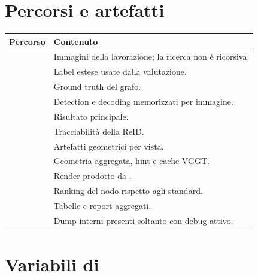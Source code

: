 \section{Percorsi e artefatti}

\begin{longtable}{P{0.43\textwidth}P{0.45\textwidth}}
\toprule
\textbf{Percorso} & \textbf{Contenuto}\\
\midrule\endhead
{} & Immagini della lavorazione; la ricerca non è ricorsiva.\\
 & Label estese usate dalla valutazione.\\
 & Ground truth del grafo.\\
 & Detection e decoding memorizzati per immagine.\\
 & Risultato principale.\\
 & Tracciabilità della ReID.\\
 & Artefatti geometrici per vista.\\
 & Geometria aggregata, hint e cache VGGT.\\
 & Render prodotto da .\\
 & Ranking del nodo rispetto agli standard.\\
 & Tabelle e report aggregati.\\
 & Dump interni presenti soltanto con debug attivo.\\
\bottomrule
\end{longtable}

\section{Variabili di }

